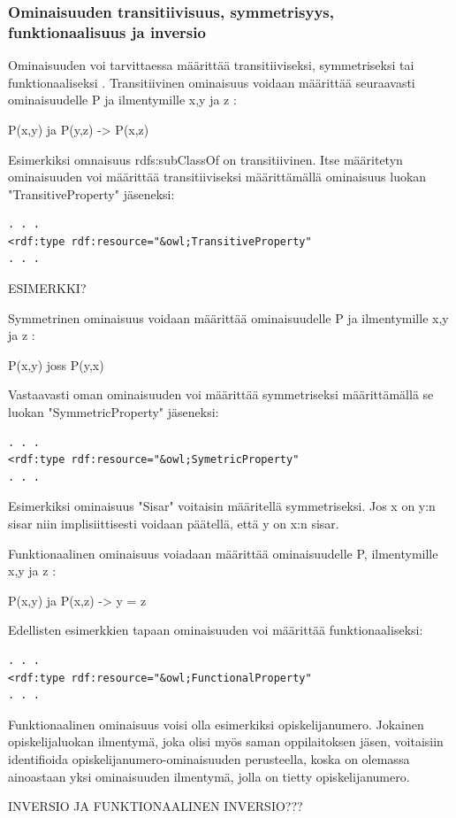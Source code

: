 \documentclass[finnish]{tktltiki2}
\theoremstyle{definition}
\theoremstyle{remark}
\begin{document}
\subsubsection{Ominaisuuden transitiivisuus, symmetrisyys, funktionaalisuus ja inversio}
Ominaisuuden voi tarvittaessa määrittää transitiiviseksi, symmetriseksi tai funktionaaliseksi \cite{SWM04}. Transitiivinen ominaisuus voidaan määrittää seuraavasti ominaisuudelle P ja ilmentymille x,y ja z \cite{SWM04}:

P(x,y) ja P(y,z) -> P(x,z)

Esimerkiksi omnaisuus rdfs:subClassOf on transitiivinen. Itse määritetyn ominaisuuden voi määrittää transitiiviseksi määrittämällä ominaisuus luokan "TransitiveProperty" jäseneksi:
\begin{verbatim}
. . .
<rdf:type rdf:resource="&owl;TransitiveProperty"
. . .
\end{verbatim}
ESIMERKKI?

Symmetrinen ominaisuus voidaan määrittää ominaisuudelle P ja ilmentymille x,y ja z  \cite{SWM04}:

P(x,y) joss P(y,x)

Vastaavasti oman ominaisuuden voi määrittää symmetriseksi määrittämällä se luokan "SymmetricProperty" jäseneksi:
\begin{verbatim}
. . .
<rdf:type rdf:resource="&owl;SymetricProperty"
. . .
\end{verbatim}
Esimerkiksi ominaisuus "Sisar" voitaisin määritellä symmetriseksi. Jos x on y:n sisar niin implisiittisesti voidaan päätellä, että y on x:n sisar.

Funktionaalinen ominaisuus voiadaan määrittää ominaisuudelle P, ilmentymille x,y ja z  \cite{SWM04}:

P(x,y) ja P(x,z) -> y = z

Edellisten esimerkkien tapaan ominaisuuden voi määrittää funktionaaliseksi:
\begin{verbatim}
. . .
<rdf:type rdf:resource="&owl;FunctionalProperty"
. . .
\end{verbatim}
Funktionaalinen ominaisuus voisi olla esimerkiksi opiskelijanumero. Jokainen opiskelijaluokan ilmentymä, joka olisi myös saman oppilaitoksen jäsen, voitaisiin identifioida opiskelijanumero-ominaisuuden perusteella, koska on olemassa ainoastaan yksi ominaisuuden ilmentymä, jolla on tietty opiskelijanumero.

INVERSIO JA FUNKTIONAALINEN INVERSIO???

   
 
\end{document}
